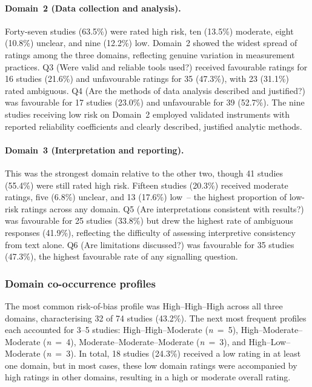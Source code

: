 \documentclass[etq]{acnsart}
\begin{document}
	\paragraph{Domain~2 (Data collection and analysis).} Forty-seven studies (63.5\%) were rated high risk, ten (13.5\%) moderate, eight (10.8\%) unclear, and nine (12.2\%) low. Domain~2 showed the widest spread of ratings among the three domains, reflecting genuine variation in measurement practices. Q3 (Were valid and reliable tools used?) received favourable ratings for 16 studies (21.6\%) and unfavourable ratings for 35 (47.3\%), with 23 (31.1\%) rated ambiguous. Q4 (Are the methods of data analysis described and justified?) was favourable for 17 studies (23.0\%) and unfavourable for 39 (52.7\%). The nine studies receiving low risk on Domain~2 employed validated instruments with reported reliability coefficients and clearly described, justified analytic methods.
	
	\paragraph{Domain~3 (Interpretation and reporting).} This was the strongest domain relative to the other two, though 41 studies (55.4\%) were still rated high risk. Fifteen studies (20.3\%) received moderate ratings, five (6.8\%) unclear, and 13 (17.6\%) low~-- the highest proportion of low-risk ratings across any domain. Q5 (Are interpretations consistent with results?) was favourable for 25 studies (33.8\%) but drew the highest rate of ambiguous responses (41.9\%), reflecting the difficulty of assessing interpretive consistency from text alone. Q6 (Are limitations discussed?) was favourable for 35 studies (47.3\%), the highest favourable rate of any signalling question.
	
	\subsubsection{Domain co-occurrence profiles}
	\label{sec:results_rq3_profiles}
	
	The most common risk-of-bias profile was High--High--High across all three domains, characterising 32 of 74 studies (43.2\%). The next most frequent profiles each accounted for 3--5 studies: High--High--Moderate (\textit{n}~=~5), High--Moderate--Moderate (\textit{n}~=~4), Moderate--Moderate--Moderate (\textit{n}~=~3), and High--Low--Moderate (\textit{n}~=~3). In total, 18 studies (24.3\%) received a low rating in at least one domain, but in most cases, these low domain ratings were accompanied by high ratings in other domains, resulting in a high or moderate overall rating.
	
\end{document}
